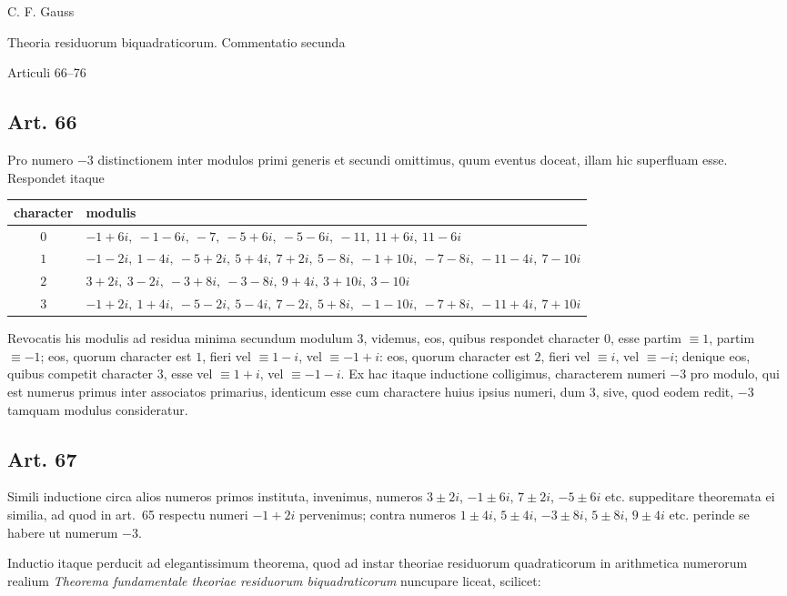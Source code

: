 \documentclass[12pt]{article}
\newcommand{\art}[1]{\subsection*{Art. #1}}
\begin{document}
\begin{center}
{\Large C. F. Gauss}\par
{\large Theoria residuorum biquadraticorum. Commentatio secunda}\par
{\large Articuli 66--76}
\end{center}

\art{66}
Pro numero $-3$ distinctionem inter modulos primi generis et secundi omittimus, quum eventus doceat, illam hic superfluam esse. Respondet itaque
\begin{center}\small
\begin{tabular}{c p{5.4in}}
\toprule
character & modulis\\
\midrule
$0$ & $-1+6i,\ -1-6i,\ -7,\ -5+6i,\ -5-6i,\ -11,\ 11+6i,\ 11-6i$\\
$1$ & $-1-2i,\ 1-4i,\ -5+2i,\ 5+4i,\ 7+2i,\ 5-8i,\ -1+10i,\ -7-8i,\ -11-4i,\ 7-10i$\\
$2$ & $3+2i,\ 3-2i,\ -3+8i,\ -3-8i,\ 9+4i,\ 3+10i,\ 3-10i$\\
$3$ & $-1+2i,\ 1+4i,\ -5-2i,\ 5-4i,\ 7-2i,\ 5+8i,\ -1-10i,\ -7+8i,\ -11+4i,\ 7+10i$\\
\bottomrule
\end{tabular}
\end{center}

Revocatis his modulis ad residua minima secundum modulum $3$, videmus, eos, quibus respondet character $0$, esse partim $\equiv1$, partim $\equiv-1$; eos, quorum character est $1$, fieri vel $\equiv1-i$, vel $\equiv-1+i$: eos, quorum character est $2$, fieri vel $\equiv i$, vel $\equiv-i$; denique eos, quibus competit character $3$, esse vel $\equiv1+i$, vel $\equiv-1-i$. Ex hac itaque inductione colligimus, characterem numeri $-3$ pro modulo, qui est numerus primus inter associatos primarius, identicum esse cum charactere huius ipsius numeri, dum $3$, sive, quod eodem redit, $-3$ tamquam modulus consideratur.

\art{67}
Simili inductione circa alios numeros primos instituta, invenimus, numeros $3\pm2i$, $-1\pm6i$, $7\pm2i$, $-5\pm6i$ etc. suppeditare theoremata ei similia, ad quod in art.~65 respectu numeri $-1+2i$ pervenimus; contra numeros $1\pm4i$, $5\pm4i$, $-3\pm8i$, $5\pm8i$, $9\pm4i$ etc. perinde se habere ut numerum $-3$.

Inductio itaque perducit ad elegantissimum theorema, quod ad instar theoriae residuorum quadraticorum in arithmetica numerorum realium \textit{Theorema fundamentale theoriae residuorum biquadraticorum} nuncupare liceat, scilicet:
\end{document}
